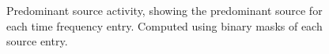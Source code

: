 \begin{figure}[H]
    \centering
    \tiny
    \hfill
    \hfill
    \hfill
    \caption{Predominant source activity, showing the predominant source for each time frequency entry. Computed using binary masks of each source entry.}
    \label{fig:dominance}
\end{figure}

